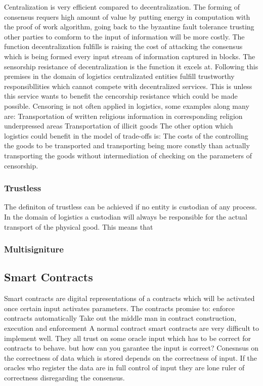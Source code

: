 \documentclass[Nomencl]{DylanMaster}
\begin{document}
Centralization is very efficient compared to decentralization. The forming of consensus requers high amount of value by putting energy in computation with the proof of work algorithm, going back to the byzantine fault tolerance trusting other parties to comform to the input of information will be more costly. The function decentralization fulfills is raising the cost of attacking the consensus which is being formed every input stream of information captured in blocks. The sensorship resistance of decentralization is the function it excels at.
Following this premises in the domain of logistics centralizated entities fulfill trustworthy responsibllities which cannot compete with decentralized services. This is unless this service wants to benefit the cencorship resistance which could be made possible. Censoring is not often applied in logistics, some examples along many are:
Transportation of written religious information in corresponding religion underpressed areas
Transportation of illicit goods
The other option which logistics could benefit in the model of trade-offs is:
The costs of the controlling the goods to be transported and transporting being more constly than actually transporting the goods without intermediation of checking on the parameters of censorship.

\subsubsection{Trustless}

The definiton of trustless can be achieved if no entity is custodian of any process. In the domain of logistics a custodian will always be responsible for the actual transport of the physical good. This means that

\subsubsection{Multisigniture}



\subsection{Smart Contracts}

Smart contracts are digital representations of a contracts which will be activated once certain input activates parameters. The contracts promise to:
 enforce contracts automatically
Take out the middle man in contract construction, execution and enforcement
A normal contract
smart contracts are very difficult to implement well. They all trust on some oracle input which has to be correct for contracts to behave.  but how can you garantee the input is correct? Conesnsus on the correctness of data which is stored depends on the correctness of input. If the oracles who register the data are in full control of input they are lone ruler of correctness disregarding the consensus.
\end{document}
